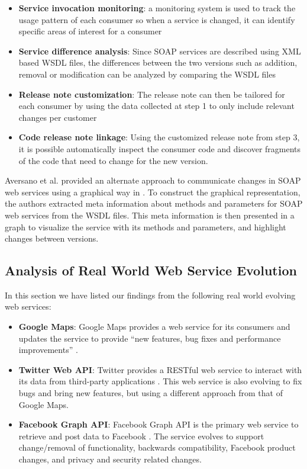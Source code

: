 \documentclass[runningheads,a4paper]{llncs}
\begin{document}
\begin{itemize}
  \item \textbf{Service invocation monitoring}: a monitoring system is used to track the usage pattern of each consumer so when a service is changed, it can identify specific areas of interest for a consumer
  \item \textbf{Service difference analysis}: Since SOAP services are described using XML based WSDL files, the differences between the two versions such as addition, removal or modification can be analyzed by comparing the WSDL files
  \item \textbf{Release note customization}: The release note can then be tailored for each consumer by using the data collected at step 1 to only include relevant changes per customer
  \item \textbf{Code release note linkage}: Using the customized release note from step 3, it is possible automatically inspect the consumer code and discover fragments of the code that need to change for the new version.
\end{itemize}

Aversano et al. provided an alternate approach to communicate changes in SOAP web services using a graphical way in \cite{aversano2005visualizing}. To construct the graphical representation, the authors extracted meta information about methods and parameters for SOAP web services from the WSDL files. This meta information is then presented in a graph to visualize the service with its methods and parameters, and highlight changes between versions.



\subsection{Analysis of Real World Web Service Evolution} %
\label{sub:review_of_industry_examples}

In this section we have listed our findings from the following real world evolving web services:

\begin{itemize}
  \item \textbf{Google Maps}: Google Maps provides a web service for its consumers and updates the service to provide ``new features, bug fixes and performance improvements'' \cite{google_maps_versioning}.
  \item \textbf{Twitter Web API}: Twitter provides a RESTful web service to interact with its data from third-party applications \cite{twitter_api}. This web service is also evolving to fix bugs and bring new features, but using a different approach from that of Google Maps.
  \item \textbf{Facebook Graph API}: Facebook Graph API is the primary web service to retrieve and post data to Facebook \cite{facebook_api}. The service evolves to support change/removal of functionality, backwards compatibility, Facebook product changes, and privacy and security related changes.
\end{itemize}
\end{document}

